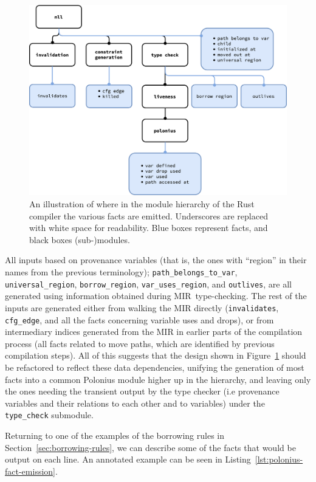 \documentclass[11pt,a4paper,twoside,openany]{report}
\begin{document}
\begin{figure}
  \includegraphics[width=0.9\linewidth]{Graphs/rustc-module-structure}
  \caption{An illustration of where in the module hierarchy of the Rust compiler
    the various facts are emitted. Underscores are replaced with white space for
    readability. Blue boxes represent facts, and black boxes (sub-)modules.}
  \label{fig:fact-module-hierarchy}
\end{figure}

All inputs based on provenance variables (that is, the ones with ``region'' in
their names from the previous terminology); \texttt{path\_belongs\_to\_var},
\texttt{universal\_region}, \texttt{borrow\_region}, \texttt{var\_uses\_region}, and
\texttt{outlives}, are all generated using information obtained during
MIR~type-checking. The rest of the inputs are generated either from walking the
MIR directly (\texttt{invalidates}, \texttt{cfg\_edge}, and all the facts
concerning variable uses and drops), or from intermediary indices generated from
the MIR in earlier parts of the compilation process (all facts related to move
paths, which are identified by previous compilation steps). All of this suggests
that the design shown in Figure~\ref{fig:fact-module-hierarchy} should be
refactored to reflect these data dependencies, unifying the generation of most
facts into a common Polonius module higher up in the hierarchy, and leaving only
the ones needing the transient output by the type checker (i.e provenance
variables and their relations to each other and to variables) under the
\texttt{type\_check} submodule.

Returning to one of the examples of the borrowing rules in
Section~\ref{sec:borrowing-rules}, we can describe some of the facts that would
be output on each line. An annotated example can be seen in
Listing~\ref{lst:polonius-fact-emission}.
\end{document}
